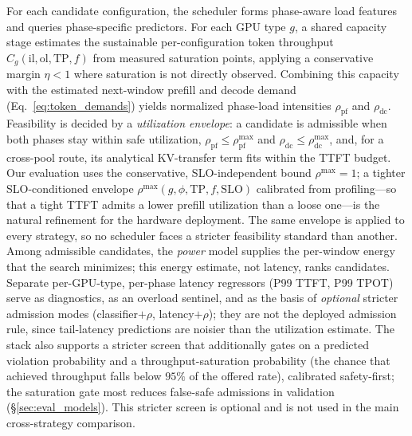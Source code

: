 For each candidate configuration, the scheduler forms phase-aware load features and queries phase-specific predictors.
For each GPU type $g$, a shared capacity stage estimates the sustainable per-configuration token throughput $\widehat{C}_g(\mathrm{il},\mathrm{ol},\mathrm{TP},f)$ from measured saturation points, applying a conservative margin $\eta<1$ where saturation is not directly observed.
Combining this capacity with the estimated next-window prefill and decode demand (Eq.~\ref{eq:token_demands}) yields normalized phase-load intensities $\rho_{\mathrm{pf}}$ and $\rho_{\mathrm{dc}}$.
Feasibility is decided by a \emph{utilization envelope}: a candidate is admissible when both phases stay within safe utilization, $\rho_{\mathrm{pf}}\le\rho^{\max}_{\mathrm{pf}}$ and $\rho_{\mathrm{dc}}\le\rho^{\max}_{\mathrm{dc}}$, and, for a cross-pool route, its analytical KV-transfer term fits within the TTFT budget.
Our evaluation uses the conservative, SLO-independent bound $\rho^{\max}{=}1$; a tighter SLO-conditioned envelope $\rho^{\max}(g,\phi,\mathrm{TP},f,\mathrm{SLO})$ calibrated from profiling---so that a tight TTFT admits a lower prefill utilization than a loose one---is the natural refinement for the hardware deployment. The same envelope is applied to every strategy, so no scheduler faces a stricter feasibility standard than another.
Among admissible candidates, the \emph{power} model supplies the per-window energy that the search minimizes; this energy estimate, not latency, ranks candidates.
Separate per-GPU-type, per-phase latency regressors (P99 TTFT, P99 TPOT) serve as diagnostics, as an overload sentinel, and as the basis of \emph{optional} stricter admission modes (classifier$+\rho$, latency$+\rho$); they are not the deployed admission rule, since tail-latency predictions are noisier than the utilization estimate.
The stack also supports a stricter screen that additionally gates on a predicted violation probability and a throughput-saturation probability (the chance that achieved throughput falls below $95\%$ of the offered rate), calibrated safety-first; the saturation gate most reduces false-safe admissions in validation (\S\ref{sec:eval_models}). This stricter screen is optional and is not used in the main cross-strategy comparison.

